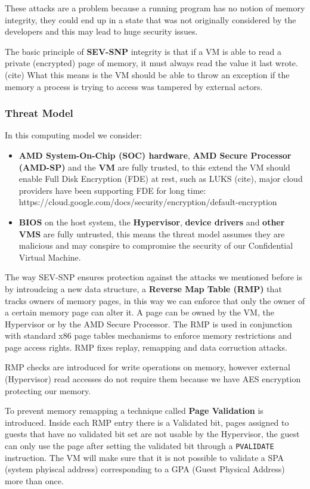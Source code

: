 \documentclass[twocolumn]{article}
\begin{document}
    These attacks are a problem because a running program has no notion of memory integrity, they could end up in a state that was not originally considered by the developers and this may lead to huge security issues.

    The basic principle of \textbf{SEV-SNP} integrity is that if a VM is able to read a private (encrypted) page of memory, it must always read the value it last wrote. (cite) What this means is the VM should be able to throw an exception if the memory a process is trying to access was tampered by external actors.

    \subsubsection*{Threat Model}
        In this computing model we consider:
        \begin{itemize}
            \item \textbf{AMD System-On-Chip (SOC) hardware}, \textbf{AMD Secure Processor (AMD-SP)} and the \textbf{VM} are fully trusted, to this extend the VM should enable Full Disk Encryption (FDE) at rest, such as LUKS (cite), major cloud providers have been supporting FDE for long time:  https://cloud.google.com/docs/security/encryption/default-encryption
            \item \textbf{BIOS} on the host system, the \textbf{Hypervisor}, \textbf{device drivers} and \textbf{other VMS} are fully untrusted, this means the threat model assumes they are malicious and may conspire to compromise the security of our Confidential Virtual Machine.
        \end{itemize}

    The way SEV-SNP ensures protection against the attacks we mentioned before is by introudcing a new data structure, a \textbf{Reverse Map Table (RMP)} that tracks owners of memory pages, in this way we can enforce that only the owner of a certain memory page can alter it. A page can be owned by the VM, the Hypervisor or by the AMD Secure Processor. The RMP is used in conjunction with standard x86 page tables mechanisms to enforce memory restrictions and page access rights. RMP fixes replay, remapping and data corruction attacks. 

    RMP checks are introduced for write operations on memory, however external (Hypervisor) read accesses do not require them because we have AES encryption protecting our memory.

    To prevent memory remapping a technique called \textbf{Page Validation} is introduced.
    Inside each RMP entry there is a Validated bit, pages assigned to guests that have no validated bit set are not usable by the Hypervisor, the guest can only use the page after setting the validated bit through a \texttt{PVALIDATE} instruction. The VM will make sure that it is not possible to validate a SPA (system phyiscal address) corresponding to a GPA (Guest Physical Address) more than once.
 
\end{document}
